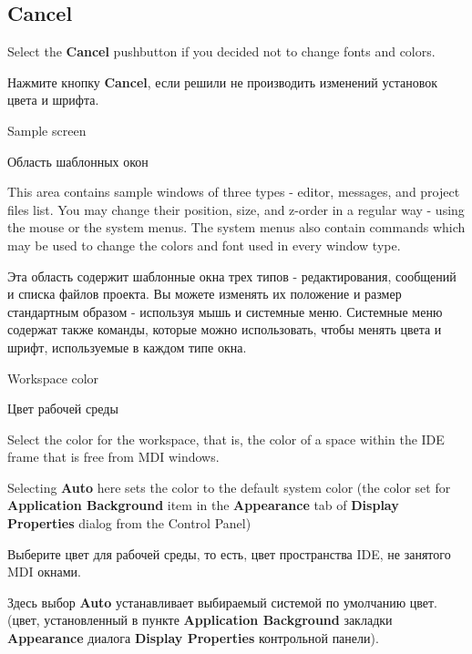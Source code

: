 \begin{popup}
\subsection{Cancel}

\ifenglish
Select the {\bf Cancel} pushbutton if you decided not to change
fonts and colors.

\else
Нажмите кнопку {\bf Cancel}, если решили не производить изменений установок
цвета и шрифта.
\fi
\end{popup}

\begin{popup}
\ifenglish
\caption{Sample screen}
\else
\caption{Область шаблонных окон}
\fi
{}

\ifenglish
This area contains sample windows of three types - editor, messages, and
project files list. You may change their position, size, and z-order in
a regular way - using the mouse or the system menus. The system menus also
contain commands which may be used to change the colors and font used
in every window type.

\else
Эта область содержит шаблонные окна трех типов - редактирования, сообщений и
списка файлов проекта. Вы можете изменять их положение и размер
стандартным образом - используя мышь и системные меню. Системные меню содержат
также команды, которые можно использовать, чтобы менять цвета и шрифт,
используемые в каждом типе окна.
\fi
\end{popup}

\begin{popup}
\ifenglish
\caption{Workspace color}
\else
\caption{Цвет рабочей среды}
\fi
{}

\ifenglish
Select the color for the workspace, that is, the color of a space within
the IDE frame that is free from MDI windows.

Selecting {\bf Auto} here sets the color to the default system color (the color
set for {\bf Application Background} item in the {\bf Appearance} tab of
{\bf Display Properties} dialog from the Control Panel)

\else
Выберите цвет для рабочей среды, то есть, цвет пространства IDE, не занятого
MDI окнами.

Здесь выбор {\bf Auto} устанавливает выбираемый системой по умолчанию цвет.
(цвет, установленный в пункте {\bf Application Background} закладки
{\bf Appearance} диалога {\bf Display Properties} контрольной панели).
\fi
\end{popup}

